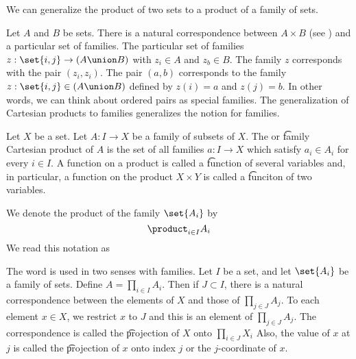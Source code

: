 

We can generalize the product of two sets to a product of a family of sets.


Let $A$ and $B$ be sets.
There is a natural correspondence between $A \times B$ (see ) and a particular set of families.
The particular set of families $z: \set{i, j} \to (A \union B)$ with $z_i \in A$ and $z_b \in B$.
The family $z$ corresponds with the pair $(z_i, z_i)$.
The pair $(a, b)$ corresponds to the family $z: \set{i, j} \in (A \union B)$ defined by $z(i) = a$ and $z(j) = b$.
In other words, we can think about ordered pairs as special families.
The generalization of Cartesian products to families generalizes the notion for families.


Let $X$ be a set.
Let $A: I \to X$ be a family of subsets of $X$.
The  or \t{family Cartesian product} of $A$ is the set of all families $a: I \to X$ which satisfy $a_i \in A_i$ for every $i \in I$.
A function on a product is called a \t{function of several variables} and, in particular, a function on the product $X \times Y$ is called a \t{funciton of two variables.}


We denote the product of the family $\set{A_i}$ by
\[
  \product_{i \in I} A_i
\]
We read this notation as 
%


The word  is used in two senses with families.
Let $I$ be a set, and let $\set{A_i}$ be a family of sets.
Define $A = \prod_{i \in I} A_i$.
Then if $J \subset I$, there is a natural correspondence between the elements of $X$ and those of $\prod_{j \in J} A_j$.
To each element $x \in X$, we restrict $x$ to $J$ and this is an element of $\prod_{j \in J} A_j$.
The correspondence is called the \t{projection} of $X$ onto $\prod_{i \in J} X_i$
Also, the value of $x$ at $j$ is called the \t{projection of $x$ onto index $j$} or the \t{$j$-coordinate} of $x$.
